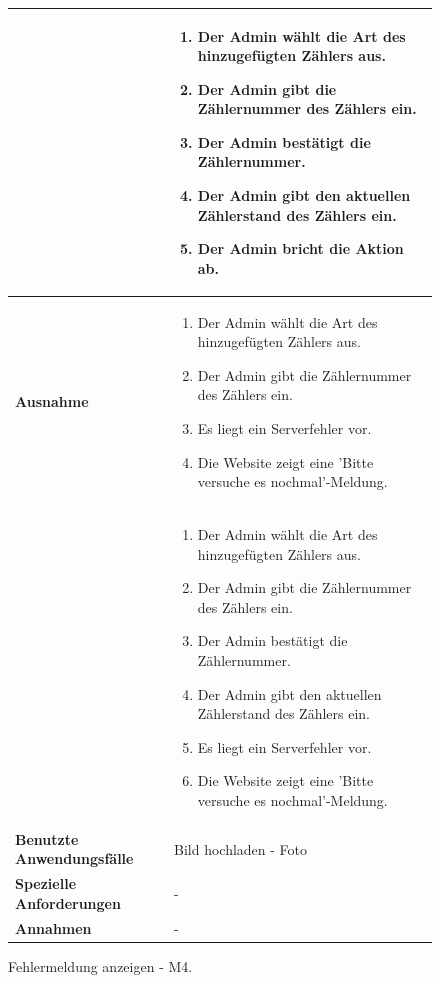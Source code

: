 \begin{figure}[h]
	\centering
	\begin{tabularx}{\textwidth}{ X | X }
	&
		\begin{enumerate}
			\item Der Admin wählt die Art des hinzugefügten Zählers aus.
			\item Der Admin gibt die Zählernummer des Zählers ein.
			\item Der Admin bestätigt die Zählernummer.
			\item Der Admin gibt den aktuellen Zählerstand des Zählers ein.
			\item Der Admin bricht die Aktion ab.
		\end{enumerate} \\ \hline
		\textbf{Ausnahme} & 
		\begin{enumerate}
			\item Der Admin wählt die Art des hinzugefügten Zählers aus.
			\item Der Admin gibt die Zählernummer des Zählers ein.
			\item Es liegt ein Serverfehler vor.
			\item Die Website zeigt eine 'Bitte versuche es nochmal'-Meldung.
		\end{enumerate} \\ &
		\begin{enumerate}
			\item Der Admin wählt die Art des hinzugefügten Zählers aus.
			\item Der Admin gibt die Zählernummer des Zählers ein.
			\item Der Admin bestätigt die Zählernummer.
			\item Der Admin gibt den aktuellen Zählerstand des Zählers ein.
			\item Es liegt ein Serverfehler vor.
			\item Die Website zeigt eine 'Bitte versuche es nochmal'-Meldung.
		\end{enumerate} \\ \hline
		\textbf{Benutzte Anwendungsfälle} & Bild hochladen - Foto \\ \hline
		\textbf{Spezielle Anforderungen} & - \\ \hline
		\textbf{Annahmen} & -
	\end{tabularx}
	\caption{Fehlermeldung anzeigen - M4.}
	\label{fig:anwendungsfall-server-tabelle-xx-1}
\end{figure}


